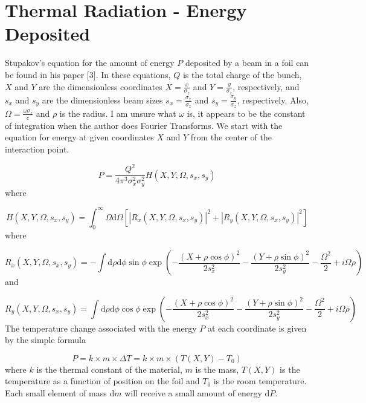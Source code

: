 \documentclass[12pt]{article}
\begin{document}
\section{Thermal Radiation - Energy Deposited}

Stupakov's equation for the amount of energy $P$ deposited by a beam in a foil can be found in his paper [3]. In these equations, $Q$ is the total charge of the bunch, $X$ and $Y$ are the dimensionless coordinates $X=\frac{x}{\sigma_z}$ and $Y=\frac{y}{\sigma_z}$, respectively, and $s_x$ and $s_y$ are the dimensionless beam sizes $s_x=\frac{\sigma_x}{\sigma_z}$ and $s_y=\frac{\sigma_y}{\sigma_z}$, respectively. Also, $\Omega=\frac{\omega \sigma_z}{c}$ and $\rho$ is the radius. I am unsure what $\omega$ is, it appears to be the constant of integration when the author does Fourier Transforms. We start with the equation for energy at given coordinates $X$ and $Y$ from the center of the interaction point.

\begin{equation}
P=\frac{Q^2}{4 \pi^{3} \sigma_{x}^{2} \sigma_{y}^{2}} H(X,Y,\Omega,s_x,s_y)
\end{equation}
where

\begin{equation}
H(X,Y,\Omega,s_x,s_y)=\int_0^{\infty} \Omega \mathrm{d} \Omega [|R_{x} (X,Y,\Omega,s_x,s_y)|^2+|R_{y} (X,Y,\Omega,s_x,s_y)|^2]
\end{equation}
where

\begin{equation}
R_{x} (X,Y,\Omega,s_x,s_y)=- \int \mathrm{d} \rho \mathrm{d} \phi \sin \phi \exp{(-\frac{(X+\rho \cos \phi)^2}{2 s_{x}^{2}}-\frac{(Y+\rho \sin \phi)^2}{2 s_{y}^{2}}-\frac{\Omega^2}{2}+i \Omega \rho)}
\end{equation}
and

\begin{equation}
R_{y} (X,Y,\Omega,s_x,s_y)= \int \mathrm{d} \rho \mathrm{d} \phi \cos \phi \exp{(-\frac{(X+\rho \cos \phi)^2}{2 s_{x}^{2}}-\frac{(Y+\rho \sin \phi)^2}{2 s_{y}^{2}}-\frac{\Omega^2}{2}+i \Omega \rho)}
\end{equation}
The temperature change associated with the energy $P$ at each coordinate is given by the simple formula

\begin{equation}
P=k \times m \times \Delta T=k \times m \times (T(X,Y)-T_0)
\end{equation}
where $k$ is the thermal constant of the material, $m$ is the mass, $T(X,Y)$ is the temperature as a function of position on the foil and $T_0$ is the room temperature. Each small element of mass d$m$ will receive a small amount of energy d$P$.
\end{document}
